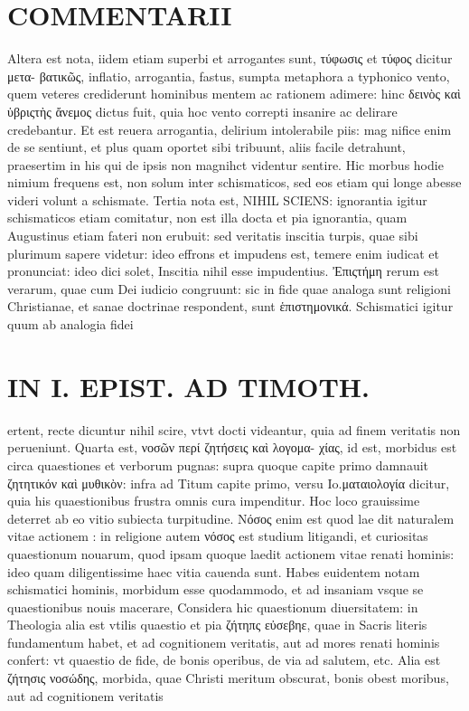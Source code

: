 \documentclass{article}
\begin{document}
\begin{pages}
\section*{COMMENTARII }
\marginpar{[ p.150 ]}\pstart Altera est nota, iidem etiam superbi et arrogantes sunt, τύφωσις et τύφος dicitur  μετα- βατικῶς, inflatio, arrogantia, fastus, sumpta metaphora a typhonico vento, quem veteres crediderunt hominibus mentem ac rationem adimere: hinc δεινὸς καὶ ὑβριςτὴς ἄνεμος dictus fuit, quia hoc vento correpti insanire ac delirare credebantur. Et est reuera arrogantia, delirium intolerabile piis: mag nifice enim de se sentiunt, et plus quam oportet sibi tribuunt, aliis facile detrahunt, praesertim in his qui de ipsis non magnihct videntur sentire. Hic morbus hodie nimium frequens est, non solum inter schismaticos, sed eos etiam qui longe abesse videri volunt a schismate.  \pend\pstart Tertia nota est, NIHIL SCIENS: ignorantia igitur schismaticos etiam comitatur, non est illa docta et pia ignorantia, quam Augustinus etiam fateri non erubuit: sed veritatis inscitia turpis, quae sibi plurimum sapere videtur: ideo effrons et impudens est, temere enim iudicat et pronunciat: ideo dici solet, Inscitia nihil esse impudentius. Ἐπιςτήμη rerum est verarum, quae cum Dei iudicio congruunt: sic in fide quae analoga sunt religioni Christianae, et sanae doctrinae respondent, sunt ἑπιστημονικά. Schismatici igitur quum ab analogia fidei  \pend
\section*{IN I. EPIST. AD TIMOTH. }
\marginpar{[ p.151 ]}\pstart ertent, recte dicuntur nihil scire, vtvt docti videantur, quia ad finem veritatis non perueniunt.  \pend\pstart Quarta est, νοσῶν περί ζητήσεις καὶ λογομα- χίας, id est, morbidus est circa quaestiones et verborum pugnas: supra quoque capite primo damnauit ζητητικόν καὶ μυθικὸν: infra ad Titum capite primo, versu Io.ματαιολογία dicitur, quia his quaestionibus frustra omnis cura impenditur. Hoc loco grauissime deterret ab eo vitio subiecta turpitudine. Νόσος  enim est quod lae dit naturalem vitae actionem : in religione autem νόσος est studium litigandi, et curiositas quaestionum nouarum, quod ipsam quoque laedit actionem vitae renati hominis: ideo quam diligentissime haec vitia cauenda sunt. Habes euidentem notam schismatici hominis, morbidum esse quodammodo, et ad insaniam vsque se quaestionibus nouis macerare, Considera hic quaestionum diuersitatem: in Theologia alia est vtilis quaestio et pia ζήτηπς εὐσεβηε, quae in Sacris literis fundamentum habet, et ad cognitionem veritatis, aut ad mores renati hominis confert: vt quaestio de fide, de bonis operibus, de via ad salutem, etc. Alia est ζήτησις νοσώδης, morbida, quae Christi meritum obscurat, bonis obest moribus, aut ad cognitionem veritatis  \pend

\end{pages}
\end{document}
